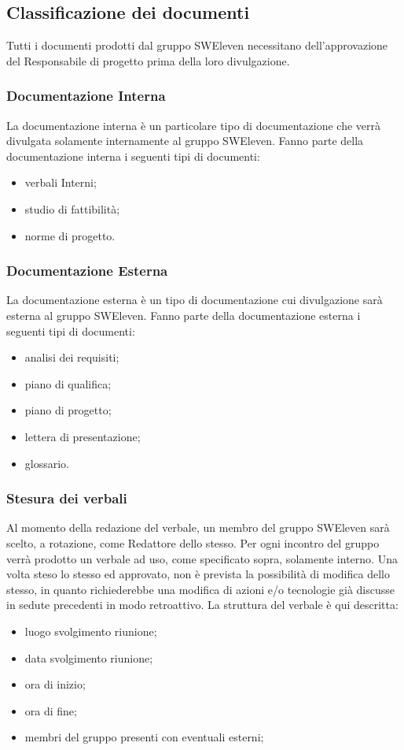 \subsection{Classificazione dei documenti}
Tutti i documenti prodotti dal gruppo SWEleven necessitano dell’approvazione del Responsabile di progetto prima della loro divulgazione.

\subsubsection{Documentazione Interna}
La documentazione interna è un particolare tipo di documentazione che verrà divulgata solamente internamente al gruppo SWEleven. Fanno parte della documentazione interna i seguenti tipi di documenti:
\begin{itemize}
	\item verbali Interni;
	\item studio di fattibilità;
	\item norme di progetto.
\end{itemize}

\subsubsection{Documentazione Esterna}
La documentazione esterna è un tipo di documentazione cui divulgazione sarà esterna al gruppo SWEleven. Fanno parte della documentazione esterna i seguenti tipi di documenti:
\begin{itemize}
	\item analisi dei requisiti;
	\item piano di qualifica;
	\item piano di progetto;
	\item lettera di presentazione;
	\item glossario.
\end{itemize}

\subsubsection{Stesura dei verbali}
Al momento della redazione del verbale, un membro del gruppo SWEleven sarà scelto, a rotazione, come Redattore dello stesso. Per ogni incontro del gruppo verrà prodotto un verbale ad uso, come specificato sopra, solamente interno. Una volta steso lo stesso ed approvato, non è prevista la possibilità di modifica dello stesso, in quanto richiederebbe una modifica di azioni e/o tecnologie già discusse in sedute precedenti in modo retroattivo. La struttura del verbale è qui descritta:
\begin{itemize}
	\item luogo svolgimento riunione;
	\item data svolgimento riunione;
	\item ora di inizio;
	\item ora di fine;
	\item membri del gruppo presenti con eventuali esterni;
\end{itemize}

